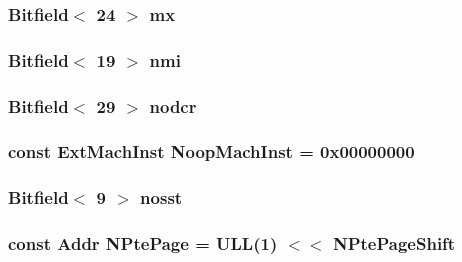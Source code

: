 \label{namespaceMipsISA_aa9e0fc4e00b6e017d9ebf3034a3c058b}
\hypertarget{namespaceMipsISA_af0f400a7e187739352fb79b272180aaa}{
\subsubsection[{mx}]{\setlength{\rightskip}{0pt plus 5cm}Bitfield$<$ 24 $>$ {\bf mx}}}
\label{namespaceMipsISA_af0f400a7e187739352fb79b272180aaa}
\hypertarget{namespaceMipsISA_a10d5955b9c41093bf6f97f63f8372fc6}{
\subsubsection[{nmi}]{\setlength{\rightskip}{0pt plus 5cm}Bitfield$<$ 19 $>$ {\bf nmi}}}
\label{namespaceMipsISA_a10d5955b9c41093bf6f97f63f8372fc6}
\hypertarget{namespaceMipsISA_a484f38d46faccff72aa369af4c8a086e}{
\subsubsection[{nodcr}]{\setlength{\rightskip}{0pt plus 5cm}Bitfield$<$ 29 $>$ {\bf nodcr}}}
\label{namespaceMipsISA_a484f38d46faccff72aa369af4c8a086e}
\hypertarget{namespaceMipsISA_a8d1e39e0ea757dcc9725c6ccd81dd4c4}{
\subsubsection[{NoopMachInst}]{\setlength{\rightskip}{0pt plus 5cm}const {\bf ExtMachInst} {\bf NoopMachInst} = 0x00000000}}
\label{namespaceMipsISA_a8d1e39e0ea757dcc9725c6ccd81dd4c4}
\hypertarget{namespaceMipsISA_acf601f49a9be58c895649c74d23ee070}{
\subsubsection[{nosst}]{\setlength{\rightskip}{0pt plus 5cm}Bitfield$<$ 9 $>$ {\bf nosst}}}
\label{namespaceMipsISA_acf601f49a9be58c895649c74d23ee070}
\hypertarget{namespaceMipsISA_ae295358052b4e754e08cd5cd763c212a}{
\subsubsection[{NPtePage}]{\setlength{\rightskip}{0pt plus 5cm}const {\bf Addr} {\bf NPtePage} = ULL(1) $<$$<$ {\bf NPtePageShift}}}
